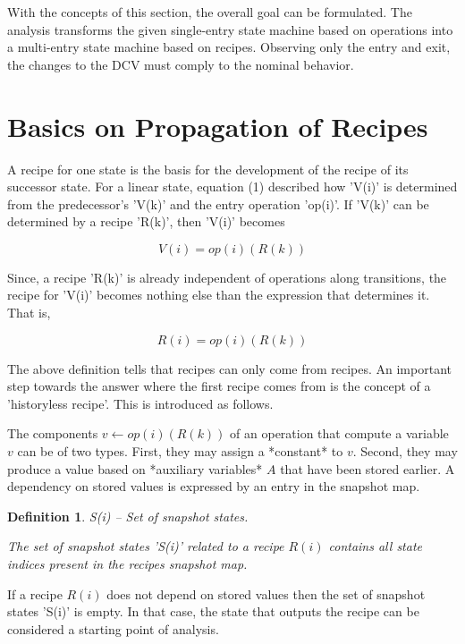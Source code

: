 \documentclass[12pt,a4paper]{scrartcl}
\theoremstyle{break}
\newtheorem{definition}{Definition}
\begin{document}
With the concepts of this section, the overall goal can be formulated. The
analysis transforms the given single-entry state machine based on operations
into a multi-entry state machine based on recipes. Observing only the entry and
exit, the changes to the DCV must comply to the nominal behavior. 

%
\section{Basics on Propagation of Recipes}

A recipe for one state is the basis for the development of the recipe of its
successor state. For a linear state, equation (1) described how 'V(i)' is
determined from the predecessor's 'V(k)' and the entry operation 'op(i)'. If
'V(k)' can be determined by a recipe 'R(k)', then 'V(i)' becomes

\[
                     V(i) = op(i)(R(k))                                     
\]

Since, a recipe 'R(k)' is already independent of operations along transitions,
the recipe for 'V(i)' becomes nothing else than the expression that
determines it. That is,

\[
                     R(i) = { op(i)(R(k)) }                                 
\]
                 
The above definition tells that recipes can only come from recipes. An
important step towards the answer where the first recipe comes from is the
concept of a 'historyless recipe'. This is introduced as follows. 

The components $v \leftarrow op(i)(R(k))$ of an operation that compute a variable $v$
can be of two types. First, they may assign a *constant* to $v$. Second, they may
produce a value based on *auxiliary variables* $A$ that have been stored earlier.
A dependency on stored values is expressed by an entry in the snapshot map.

\begin{definition}
S(i) -- Set of snapshot states.

The set of snapshot states 'S(i)' related to a recipe $R(i)$ contains
all state indices present in the recipes snapshot map.
\end{definition}

If a recipe $R(i)$ does not depend on stored values then the set of snapshot
states 'S(i)' is empty. In that case, the state that outputs the recipe can 
be considered a starting point of analysis.
\end{document}
